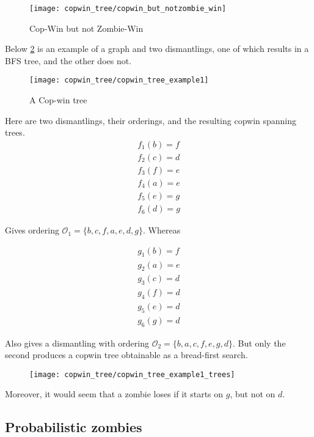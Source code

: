 \begin{figure}
\centering
\texttt{[image: copwin\_tree/copwin\_but\_notzombie\_win]}
\caption{Cop-Win but not Zombie-Win \label{fig:copwin_but_notzombie_win}}
\end{figure}

Below \ref{fig:copwin_tree_example1} is an example of a graph and two dismantlings, one of which results in a BFS tree, and the other does not.

\begin{figure}
\centering
\texttt{[image: copwin\_tree/copwin\_tree\_example1]}
\caption{A Cop-win tree \label{fig:copwin_tree_example1}}
\end{figure}

Here are two dismantlings, their orderings, and the resulting copwin spanning trees.
\begin{align*}
  f_1(b) = f \\
  f_2(c) = d \\
  f_3(f) = e \\
  f_4(a) = e \\
  f_5(e) = g \\
  f_6(d) = g
\end{align*}

Gives ordering $\mathcal{O}_1 = \{ b, c, f, a, e, d, g \}$. Whereas

\begin{align*}
  g_1(b) = f \\
  g_2(a) = e \\
  g_3(c) = d \\
  g_4(f) = d \\
  g_5(e) = d \\
  g_6(g) = d
\end{align*}

Also gives a dismantling with ordering $\mathcal{O}_2 = \{b, a, c, f, e, g, d \}$.
But only the second produces a copwin tree obtainable as a bread-first search.

\begin{figure}[h!]
\centering
\texttt{[image: copwin\_tree/copwin\_tree\_example1\_trees]}
\end{figure}

Moreover, it would seem that a zombie loses if it starts on $g$, but not on $d$.


\subsection{Probabilistic zombies}

